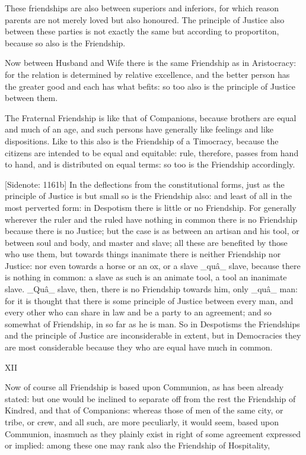 These friendships are also between superiors and inferiors, for which
reason parents are not merely loved but also honoured. The principle of
Justice also between these parties is not exactly the same but according
to proportiton, because so also is the Friendship.

Now between Husband and Wife there is the same Friendship as in
Aristocracy: for the relation is determined by relative excellence, and
the better person has the greater good and each has what befits: so too
also is the principle of Justice between them.

The Fraternal Friendship is like that of Companions, because brothers
are equal and much of an age, and such persons have generally like
feelings and like dispositions. Like to this also is the Friendship of a
Timocracy, because the citizens are intended to be equal and equitable:
rule, therefore, passes from hand to hand, and is distributed on equal
terms: so too is the Friendship accordingly.

[Sidenote: 1161b] In the deflections from the constitutional forms, just
as the principle of Justice is but small so is the Friendship also: and
least of all in the most perverted form: in Despotism there is little
or no Friendship. For generally wherever the ruler and the ruled have
nothing in common there is no Friendship because there is no Justice;
but the case is as between an artisan and his tool, or between soul and
body, and master and slave; all these are benefited by those who use
them, but towards things inanimate there is neither Friendship nor
Justice: nor even towards a horse or an ox, or a slave _quâ_ slave,
because there is nothing in common: a slave as such is an animate tool,
a tool an inanimate slave. _Quâ_ slave, then, there is no Friendship
towards him, only _quâ_ man: for it is thought that there is some
principle of Justice between every man, and every other who can share in
law and be a party to an agreement; and so somewhat of Friendship, in so
far as he is man. So in Despotisms the Friendships and the principle of
Justice are inconsiderable in extent, but in Democracies they are most
considerable because they who are equal have much in common.

XII


Now of course all Friendship is based upon Communion, as has been
already stated: but one would be inclined to separate off from the rest
the Friendship of Kindred, and that of Companions: whereas those of men
of the same city, or tribe, or crew, and all such, are more peculiarly,
it would seem, based upon Communion, inasmuch as they plainly exist in
right of some agreement expressed or implied: among these one may rank
also the Friendship of Hospitality,

